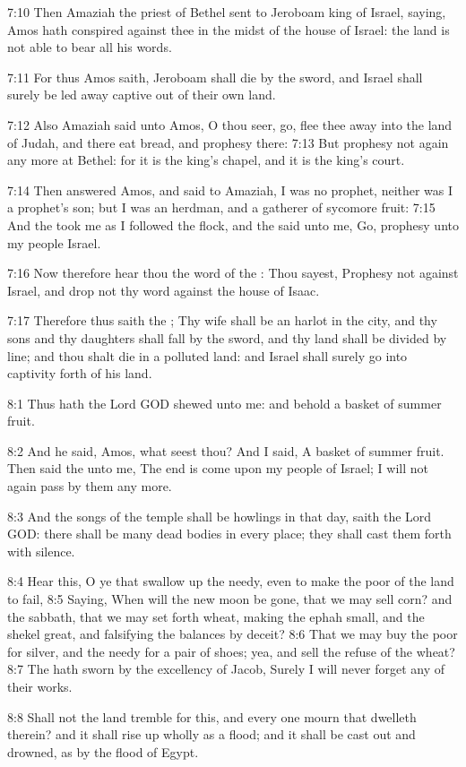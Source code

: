 7:10 Then Amaziah the priest of Bethel sent to Jeroboam king of Israel, saying, Amos hath conspired against thee in the midst of the house of Israel: the land is not able to bear all his words.

7:11 For thus Amos saith, Jeroboam shall die by the sword, and Israel shall surely be led away captive out of their own land.

7:12 Also Amaziah said unto Amos, O thou seer, go, flee thee away into the land of Judah, and there eat bread, and prophesy there: 7:13 But prophesy not again any more at Bethel: for it is the king's chapel, and it is the king's court.

7:14 Then answered Amos, and said to Amaziah, I was no prophet, neither was I a prophet's son; but I was an herdman, and a gatherer of sycomore fruit: 7:15 And the \LORD took me as I followed the flock, and the \LORD said unto me, Go, prophesy unto my people Israel.

7:16 Now therefore hear thou the word of the \LORD: Thou sayest, Prophesy not against Israel, and drop not thy word against the house of Isaac.

7:17 Therefore thus saith the \LORD; Thy wife shall be an harlot in the city, and thy sons and thy daughters shall fall by the sword, and thy land shall be divided by line; and thou shalt die in a polluted land: and Israel shall surely go into captivity forth of his land.

8:1 Thus hath the Lord GOD shewed unto me: and behold a basket of summer fruit.

8:2 And he said, Amos, what seest thou? And I said, A basket of summer fruit. Then said the \LORD unto me, The end is come upon my people of Israel; I will not again pass by them any more.

8:3 And the songs of the temple shall be howlings in that day, saith the Lord GOD: there shall be many dead bodies in every place; they shall cast them forth with silence.

8:4 Hear this, O ye that swallow up the needy, even to make the poor of the land to fail, 8:5 Saying, When will the new moon be gone, that we may sell corn? and the sabbath, that we may set forth wheat, making the ephah small, and the shekel great, and falsifying the balances by deceit?  8:6 That we may buy the poor for silver, and the needy for a pair of shoes; yea, and sell the refuse of the wheat?  8:7 The \LORD hath sworn by the excellency of Jacob, Surely I will never forget any of their works.

8:8 Shall not the land tremble for this, and every one mourn that dwelleth therein? and it shall rise up wholly as a flood; and it shall be cast out and drowned, as by the flood of Egypt.

